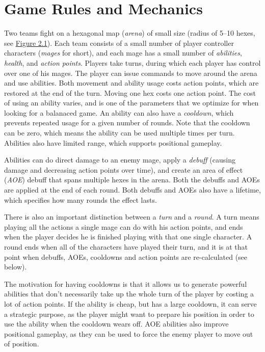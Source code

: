 \chapter{Game Rules and Mechanics}
\label{chapter02}

Two teams fight on a hexagonal map (\emph{arena}) of small size (radius of
5--10 hexes, see \hyperref[fig:arena]{Figure 2.1}). Each team consists of a small number of player controller
characters (\emph{mages} for short), and each mage has a small number of
\emph{abilities}, \emph{health}, and \emph{action points}. Players take turns, during
which each player has control over one of his mages. The player can issue
commands to move around the arena and use abilities. Both movement and ability
usage costs action points, which are restored at the end of the turn.  Moving
one hex costs one action point. The cost of using an ability varies, and is one
of the parameters that we optimize for when looking for a balanaced game. An
ability can also have a \emph{cooldown}, which prevents repeated usage for a
given number of rounds. Note that the cooldown can be zero, which means the
ability can be used multiple times per turn. Abilities also have limited range,
which supports positional gameplay.

Abilities can do direct damage to an enemy mage, apply a \emph{debuff} (causing
damage and decreasing action points over time), and create an area of effect
(\emph{AOE}) debuff that spans multiple hexes in the arena. Both the debuffs and
AOEs are applied at the end of each round. Both debuffs and AOEs also have a lifetime,
which specifies how many rounds the effect lasts.

There is also an important distinction between a \emph{turn} and a \emph{round}.
A turn means playing all the actions a single mage can do with his action points,
and ends when the player decides he is finished playing with that one single character.
A round ends when all of the characters have played their turn, and it is at that point
when debuffs, AOEs, cooldowns and action points are re-calculated (see below).

The motivation for having cooldowns is that it allows us to generate powerful
abilities that don't necessarily take up the whole turn of the player by costing
a lot of action points. If the ability is cheap, but has a large cooldown, it can
serve a strategic purpose, as the player might want to prepare his position in order
to use the ability when the cooldown wears off. AOE abilities also improve positional
gameplay, as they can be used to force the enemy player to move out of position.

